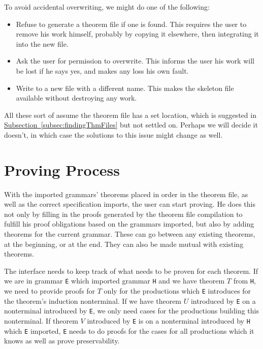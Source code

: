 \documentclass[11pt]{article}
\newcommand{\subsec}[1]{\hyperref[subsec:#1]{Subsection~\ref*{subsec:#1}}}
\newcommand{\grammar}[1]{\texttt{#1}}
\begin{document}
To avoid accidental overwriting, we might do one of the following:
\begin{itemize}
\item Refuse to generate a theorem file if one is found.  This
  requires the user to remove his work himself, probably by copying it
  elsewhere, then integrating it into the new file.
\item Ask the user for permission to overwrite.  This informs the user
  his work will be lost if he says yes, and makes any loss his own
  fault.
\item Write to a new file with a different name.  This makes the
  skeleton file available without destroying any work.
\end{itemize}
All these sort of assume the theorem file has a set location, which is
suggested in \subsec{findingThmFiles} but not settled on.  Perhaps we
will decide it doesn't, in which case the solutions to this issue
might change as well.





\section{Proving Process}

With the imported grammars' theorems placed in order in the theorem
file, as well as the correct specification imports, the user can start
proving.  He does this not only by filling in the proofs generated by
the theorem file compilation to fulfill his proof obligations based on
the grammars imported, but also by adding theorems for the current
grammar.  These can go between any existing theorems, at the
beginning, or at the end.  They can also be made mutual with existing
theorems.


The interface needs to keep track of what needs to be proven for each
theorem.
%
If we are in grammar \grammar{E} which imported grammar \grammar{H}
and we have theorem $T$ from \grammar{H}, we need to provide proofs
for $T$ only for the productions which \grammar{E} introduces for the
theorem's induction nonterminal.
%
If we have theorem $U$ introduced by \grammar{E} on a nonterminal
introduced by \grammar{E}, we only need cases for the productions
building this nonterminal.
%
If theorem $V$ introduced by \grammar{E} is on a nonterminal
introduced by \grammar{H} which \grammar{E} imported, \grammar{E}
needs to do proofs for the cases for all productions which it knows as
well as prove preservability.
\end{document}
